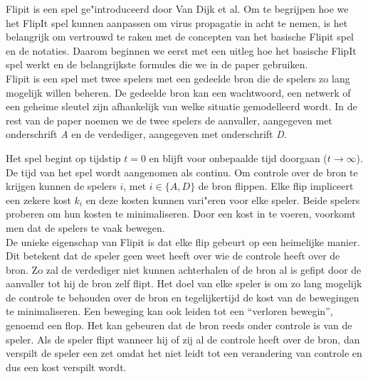 \documentclass[master=cws, masteroption=vs]{kulemt}
\begin{document}
\begin{abstract*}
Flipit is een spel ge"introduceerd door Van Dijk et al. Om te begrijpen hoe we het FlipIt spel kunnen aanpassen om virus propagatie in acht te nemen, is het belangrijk om vertrouwd te raken met de concepten van het basische Flipit spel en de notaties. Daarom beginnen we eerst met een uitleg hoe het basische FlipIt spel werkt en de belangrijkste formules die we in de paper gebruiken. \\

Flipit is een spel met twee spelers met een gedeelde bron die de spelers zo lang mogelijk willen beheren. De gedeelde bron kan een wachtwoord, een netwerk of een geheime sleutel zijn afhankelijk van welke situatie gemodelleerd wordt. In de rest van de paper noemen we de twee spelers de aanvaller, aangegeven met onderschrift  \textit{A} en de verdediger, aangegeven met onderschrift \textit{D}.

Het spel begint op tijdstip $ t = 0 $ en blijft voor onbepaalde tijd doorgaan ($ t \rightarrow \infty $). De tijd van het spel wordt aangenomen als continu. Om controle over de bron te krijgen kunnen de spelers $i$, met $ i \in \{A, D \} $ de bron flippen. Elke flip impliceert een zekere kost $ k_{i} $ en deze kosten kunnen vari"eren voor elke speler. Beide spelers proberen om hun kosten te minimaliseren. Door een kost in te voeren, voorkomt men dat de spelers te vaak bewegen. \\

De unieke eigenschap van Flipit is dat elke flip gebeurt op een heimelijke manier. Dit betekent dat de speler geen weet heeft over wie de controle heeft over de bron. Zo zal de verdediger niet kunnen achterhalen of de bron al is gefipt door de aanvaller tot hij de bron zelf flipt. Het doel van elke speler is om zo lang mogelijk de controle te behouden over de bron en tegelijkertijd de kost van de bewegingen te minimaliseren. Een beweging kan ook leiden tot een ``verloren bewegin'', genoemd een flop. Het kan gebeuren dat de bron reeds onder controle is van de speler. Als de speler flipt wanneer hij of zij al de controle  heeft over de bron, dan verspilt de speler een zet omdat het niet leidt tot een verandering van controle en dus een kost verspilt wordt. \\



\end{abstract*}
\end{document}
